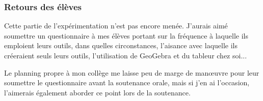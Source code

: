 \subsubsection{Retours des élèves}

Cette partie de l'expérimentation n'est pas encore menée. J'aurais aimé soumettre un questionnaire à mes élèves portant sur la fréquence à laquelle ils emploient leurs outils, dans quelles circonstances, l'aisance avec laquelle ils créeraient seuls leurs outils, l'utilisation de GeoGebra et du tableur chez soi...

Le planning propre à mon collège me laisse peu de marge de manœuvre pour leur soumettre le questionnaire avant la soutenance orale, mais si j'en ai l'occasion, l'aimerais également aborder ce point lors de la soutenance.
